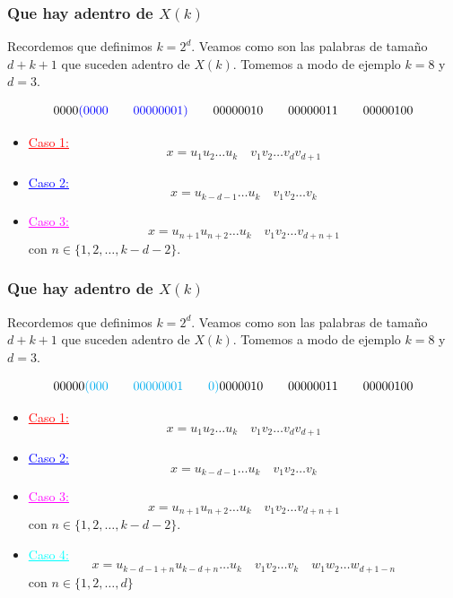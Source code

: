 \documentclass[10pt,mathserif]{beamer}%
\begin{document}
\begin{frame}
  \frametitle{Que hay adentro de $X(k)$}
  Recordemos que definimos $k = 2^d$.
  Veamos como son las palabras de tamaño $d + k + 1$ que suceden adentro de $X(k)$. Tomemos a modo de ejemplo $k = 8$ y $d = 3$.

  $$0000\textcolor{blue}{(0000 \qquad 00000001)}  \qquad 00000010 \qquad 00000011 \qquad 00000100$$

    \begin{itemize}
    \item \textcolor{red}{\underline{Caso 1:}}
    $$x = u_1 u_2 \dots u_k \quad v_1 v_2 \dots v_{d} v_{d + 1}$$  
    \item \textcolor{blue}{\underline{Caso 2:}}
    $$ x = u_{k-d-1} \dots u_k \quad v_1 v_2 \dots v_k$$
    \item \textcolor{magenta}{\underline{Caso 3:}}
    $$x = u_{n+1} u_{n+2} \dots u_k \quad  v_1 v_2 \dots v_{d+n+1} $$
    con $n \in \{1,2,\dots ,k - d - 2\}$.
    \par
  \end{itemize}
\end{frame}

\begin{frame}
  \frametitle{Que hay adentro de $X(k)$}
  Recordemos que definimos $k = 2^d$.
  Veamos como son las palabras de tamaño $d + k + 1$ que suceden adentro de $X(k)$. Tomemos a modo de ejemplo $k = 8$ y $d = 3$.

  $$00000\textcolor{cyan}{(000 \qquad 00000001 \qquad 0)}  0000010 \qquad 00000011 \qquad 00000100$$

    \begin{itemize}
    \item \textcolor{red}{\underline{Caso 1:}}
    $$x = u_1 u_2 \dots u_k \quad v_1 v_2 \dots v_{d} v_{d + 1}$$  
    \item \textcolor{blue}{\underline{Caso 2:}}
    $$ x = u_{k-d-1} \dots u_k \quad v_1 v_2 \dots v_k$$
    \item \textcolor{magenta}{\underline{Caso 3:}}
    $$x = u_{n+1} u_{n+2} \dots u_k \quad  v_1 v_2 \dots v_{d+n+1} $$
    con $n \in \{1,2,\dots ,k - d - 2\}$.
    \item \textcolor{cyan}{\underline{Caso 4:}}
    $$ x = u_{k-d-1+n} u_{k-d+n} \dots u_k \quad v_1 v_2 \dots v_k \quad w_1 w_2 \dots w_{d+1-n}$$
    con $n \in \{1, 2, \dots , d\}$
  \end{itemize}
\end{frame}
\end{document}
